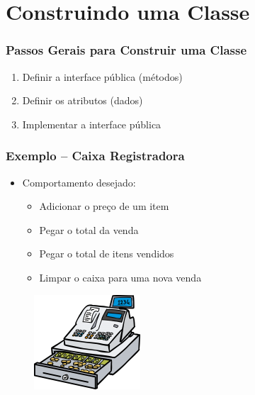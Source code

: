 \documentclass[aspectratio=169]{beamer}
\begin{document}
\section{Construindo uma Classe}

\begin{frame}\frametitle{Passos Gerais para Construir uma Classe}
\begin{enumerate}
	\item Definir a interface pública (métodos)
	\item Definir os atributos (dados)
	\item Implementar a interface pública
\end{enumerate}
\end{frame}

\begin{frame}\frametitle{Exemplo -- Caixa Registradora}
\begin{itemize}
	\item Comportamento desejado:
	\begin{itemize}
		\item Adicionar o preço de um item
		\item Pegar o total da venda
		\item Pegar o total de itens vendidos
		\item Limpar o caixa para uma nova venda
	\end{itemize}
\end{itemize}
\begin{figure}[h]
	\centering
	\includegraphics[height=0.4\paperheight]{pucrs-ec-poo-unidade_04-classes_e_objetos-laminas-caixa_registradora.png}
\end{figure}
\end{frame}
\end{document}
